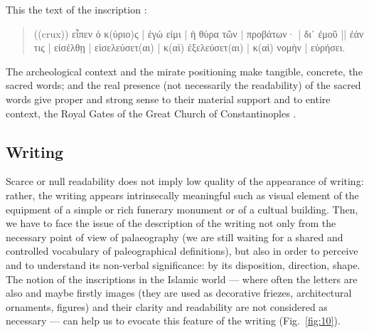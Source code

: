 \documentclass[amsthm,ebook]{saparticle}
\begin{document}
This the text of the inscription \citep[n. 505]{felle_biblia_2006}: 

\begin{quotation}
((crux)) 
εἶπεν ὁ κ(ύριο)ς \textlatin{|} ἐγώ εἰμι \textlatin{|} ἡ θύρα τῶν \textlatin{|} προβάτων· \textlatin{|} δι᾿ ἐμοῦ \textlatin{||} ἐάν τις \textlatin{|} εἰσέλθῃ \textlatin{|} εἰσελεύσετ(αι) \textlatin{|} κ(αὶ) ἐξελεύσετ(αι) \textlatin{|} κ(αὶ) νομὴν \textlatin{|} εὑρήσει.


\end{quotation}

The archeological context and the mirate positioning make tangible, concrete, the sacred words; and the real presence
(not necessarily the readability) of the sacred words give proper and strong sense to their material support and to
entire context, the Royal Gates of the Great Church of Constantinoples \citep[320 and \emph{passim}]{felle_esporre_2015}.


\vspace{2cm}

\subsection{Writing}


\noindent Scarce or null readability does not imply low quality of the appearance of writing: rather, the writing appears
intrinsecally meaningful such as visual element of the equipment of a simple or rich funerary monument or of a cultual
building. Then, we have to face the issue of the description of the writing not only from the necessary point of
view of palaeography (we are still waiting for a shared and controlled vocabulary of paleographical definitions), but
also in order to perceive and to understand its non-verbal significance: by its disposition, direction, shape. The
notion of the inscriptions in the Islamic world --- where often the letters are also and maybe firstly images (they
are used as decorative friezes, architectural ornaments, figures) and their clarity and readability are not considered
as necessary --- can help us to evocate this feature of the writing (Fig.~\ref{fig:10}).
\end{document}
